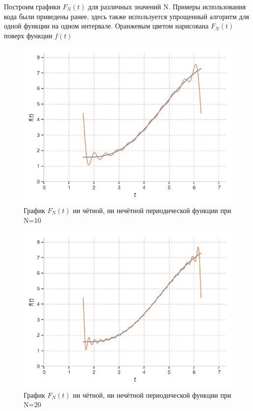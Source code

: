 \documentclass[a4paper, 16pt]{article}
\begin{document}
\noindent Построим графики $F_N(t)$ для различных значений N. Примеры использования кода были
приведены ранее, здесь также используется упрощенный алгоритм для одной функции на одном интервале.
Оранжевым цветом нарисована $F_N(t)$ поверх функции $f(t)$
\begin{figure}[!htb]
    \centering
    \includegraphics[scale=0.8]{fur_evodd_n=10.png}
    \captionsetup{skip=0pt}
    \caption{График $F_N(t)$ ни чётной, ни нечётной периодической функции при N=10}
    \label{Рис:30}
\end{figure}
\begin{figure}[!htb]
    \centering
    \includegraphics[scale=0.8]{fur_evodd_n=20.png}
    \captionsetup{skip=0pt}
    \caption{График $F_N(t)$ ни чётной, ни нечётной периодической функции при N=20}
    \label{Рис:31}
\end{figure}
\end{document}
